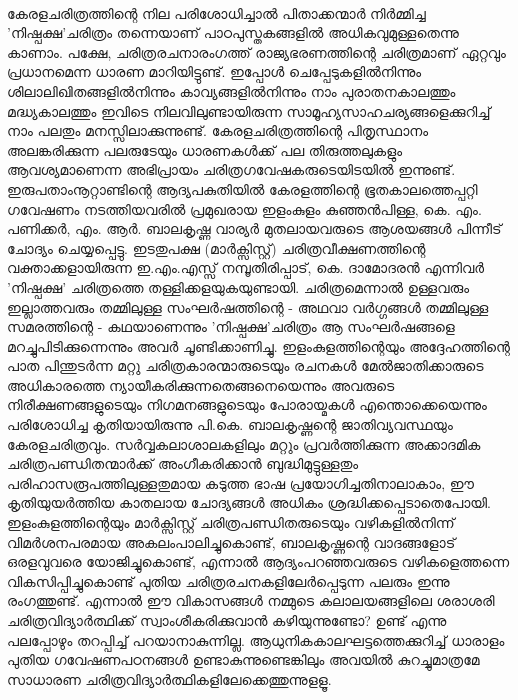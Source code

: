 	\paragraph{}കേരളചരിത്രത്തിന്റെ നില പരിശോധിച്ചാൽ പിതാക്കന്മാർ നിർമ്മിച്ച 'നിഷ്പക്ഷ'ചരിത്രം തന്നെയാണ് പാഠപുസ്തകങ്ങളിൽ അധികവുമുള്ളതെന്നു കാണാം. പക്ഷേ, ചരിത്രരചനാരംഗത്ത് രാജ്യഭരണത്തിന്റെ ചരിത്രമാണ് ഏറ്റവും പ്രധാനമെന്ന ധാരണ മാറിയിട്ടുണ്ട്. ഇപ്പോൾ ചെപ്പേടുകളിൽനിന്നും ശിലാലിഖിതങ്ങളിൽനിന്നും കാവ്യങ്ങളിൽനിന്നും നാം പുരാതനകാലത്തും മദ്ധ്യകാലത്തും ഇവിടെ നിലവിലുണ്ടായിരുന്ന സാമൂഹ്യസാഹചര്യങ്ങളെക്കുറിച്ച് നാം പലതും മനസ്സിലാക്കുന്നുണ്ട്. കേരളചരിത്രത്തിന്റെ പിതൃസ്ഥാനം അലങ്കരിക്കുന്ന പലരുടേയും ധാരണകൾക്ക് പല തിരുത്തലുകളും ആവശ്യമാണെന്ന അഭിപ്രായം ചരിത്രഗവേഷകരുടെയിടയിൽ ഇന്നുണ്ട്. ഇരുപതാംനൂറ്റാണ്ടിന്റെ ആദ്യപകുതിയിൽ കേരളത്തിന്റെ ഭൂതകാലത്തെപ്പറ്റി ഗവേഷണം നടത്തിയവരിൽ പ്രമുഖരായ ഇളംകുളം കുഞ്ഞൻപിള്ള, കെ. എം. പണിക്കർ, എം. ആർ. ബാലകൃഷ്ണ വാര്യർ മുതലായവരുടെ ആശയങ്ങൾ പിന്നീട് ചോദ്യം ചെയ്യപ്പെട്ടു. ഇടതുപക്ഷ (മാർക്സിസ്റ്റ്) ചരിത്രവീക്ഷണത്തിന്റെ വക്താക്കളായിരുന്ന ഇ.എം.എസ്സ് നമ്പൂതിരിപ്പാട്, കെ. ദാമോദരൻ എന്നിവർ 'നിഷ്പക്ഷ' ചരിത്രത്തെ തള്ളിക്കളയുകയുണ്ടായി. ചരിത്രമെന്നാൽ ഉള്ളവരും ഇല്ലാത്തവരും തമ്മിലുള്ള സംഘർഷത്തിന്റെ - അഥവാ വർഗ്ഗങ്ങൾ തമ്മിലുള്ള സമരത്തിന്റെ - കഥയാണെന്നും 'നിഷ്പക്ഷ'ചരിത്രം ആ സംഘർഷങ്ങളെ മറച്ചുപിടിക്കുന്നെന്നും അവർ ചൂണ്ടിക്കാണിച്ചു. ഇളംകുളത്തിന്റെയും അദ്ദേഹത്തിന്റെ പാത പിന്തുടർന്ന മറ്റു ചരിത്രകാരന്മാരുടെയും രചനകൾ മേൽജാതിക്കാരുടെ അധികാരത്തെ ന്യായീകരിക്കുന്നതെങ്ങനെയെന്നും അവരുടെ നിരീക്ഷണങ്ങളുടെയും നിഗമനങ്ങളുടെയും പോരായ്മകൾ എന്തൊക്കെയെന്നും പരിശോധിച്ച കൃതിയായിരുന്നു പി.കെ. ബാലകൃഷ്ണന്റെ ജാതിവ്യവസ്ഥയും കേരളചരിത്രവും. സർവ്വകലാശാലകളിലും മറ്റും പ്രവർത്തിക്കുന്ന അക്കാദമിക ചരിത്രപണ്ഡിതന്മാർക്ക് അംഗീകരിക്കാൻ ബുദ്ധിമുട്ടുള്ളതും പരിഹാസരൂപത്തിലുള്ളതുമായ കടുത്ത ഭാഷ പ്രയോഗിച്ചതിനാലാകാം, ഈ കൃതിയുയർത്തിയ കാതലായ ചോദ്യങ്ങൾ അധികം ശ്രദ്ധിക്കപ്പെടാതെപോയി. ഇളംകുളത്തിന്റെയും മാർക്സിസ്റ്റ് ചരിത്രപണ്ഡിതരുടെയും വഴികളിൽനിന്ന് വിമർശനപരമായ അകലംപാലിച്ചുകൊണ്ട്, ബാലകൃഷ്ണന്റെ വാദങ്ങളോട് ഒരളവുവരെ യോജിച്ചുകൊണ്ട്, എന്നാൽ ആദ്യംപറഞ്ഞവരുടെ വഴികളെത്തന്നെ വികസിപ്പിച്ചുകൊണ്ട് പുതിയ ചരിത്രരചനകളിലേർപ്പെടുന്ന പലരും ഇന്നു രംഗത്തുണ്ട്. എന്നാൽ ഈ വികാസങ്ങൾ നമ്മുടെ കലാലയങ്ങളിലെ ശരാശരി ചരിത്രവിദ്യാർത്ഥിക്ക് സ്വാംശീകരിക്കുവാൻ കഴിയുന്നുണ്ടോ? ഉണ്ട് എന്നു പലപ്പോഴും തറപ്പിച്ച് പറയാനാകുന്നില്ല. ആധുനികകാലഘട്ടത്തെക്കുറിച്ച് ധാരാളം പുതിയ ഗവേഷണപഠനങ്ങൾ ഉണ്ടാകുന്നുണ്ടെങ്കിലും അവയിൽ കുറച്ചുമാത്രമേ സാധാരണ ചരിത്രവിദ്യാർത്ഥികളിലേക്കെത്തുന്നുളളൂ.

